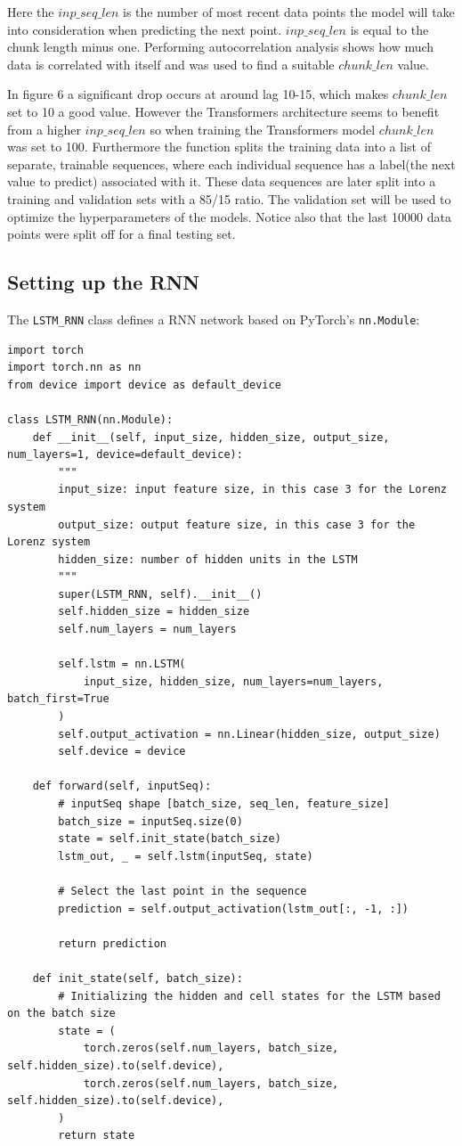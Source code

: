\documentclass[11pt]{article}
\begin{document}
Here the $inp\_seq\_len$ is the number of most recent data points the model will take into consideration when predicting the next point. $inp\_seq\_len$ is equal to the chunk length minus one. Performing autocorrelation analysis shows how much data is correlated with itself and was used to find a suitable $chunk\_len$ value.

In figure 6 a significant drop occurs at around lag 10-15, which  makes $chunk\_len$ set to 10 a good value. However the Transformers architecture seems to benefit from a higher $inp\_seq\_len$ so when training the Transformers model $chunk\_len$ was set to 100. Furthermore the function splits the training data into a list of separate, trainable sequences, where each individual sequence has a label(the next value to predict) associated with it. These data sequences are later split into a training and validation sets with a 85/15 ratio. The validation set will be used to optimize the hyperparameters of the models. Notice also that the last 10000 data points were split off for a final testing set.

\subsection{Setting up the RNN}

The \texttt{LSTM\_RNN} class defines a RNN network based on PyTorch's \texttt{nn.Module}:

\begin{lstlisting}
import torch
import torch.nn as nn
from device import device as default_device

class LSTM_RNN(nn.Module):
    def __init__(self, input_size, hidden_size, output_size, num_layers=1, device=default_device):
        """
        input_size: input feature size, in this case 3 for the Lorenz system
        output_size: output feature size, in this case 3 for the Lorenz system
        hidden_size: number of hidden units in the LSTM
        """
        super(LSTM_RNN, self).__init__()
        self.hidden_size = hidden_size
        self.num_layers = num_layers

        self.lstm = nn.LSTM(
            input_size, hidden_size, num_layers=num_layers, batch_first=True
        )
        self.output_activation = nn.Linear(hidden_size, output_size)
        self.device = device

    def forward(self, inputSeq):
        # inputSeq shape [batch_size, seq_len, feature_size]
        batch_size = inputSeq.size(0)
        state = self.init_state(batch_size)
        lstm_out, _ = self.lstm(inputSeq, state)

        # Select the last point in the sequence
        prediction = self.output_activation(lstm_out[:, -1, :])

        return prediction

    def init_state(self, batch_size):
        # Initializing the hidden and cell states for the LSTM based on the batch size
        state = (
            torch.zeros(self.num_layers, batch_size, self.hidden_size).to(self.device),
            torch.zeros(self.num_layers, batch_size, self.hidden_size).to(self.device),
        )
        return state
\end{lstlisting}
\end{document}
